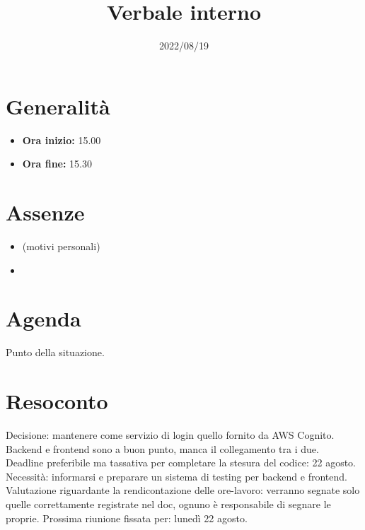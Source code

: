 \documentclass{classes/base}
\title{Verbale interno}
\date{2022/08/19}
\author{\marcob}
\renewcommand{\maketitle}{
    
}
\begin{document}
    \maketitle

    \section*{Generalità}
    \begin{itemize}
        \item \textbf{Ora inizio:} 15.00
        \item \textbf{Ora fine:} 15.30
    \end{itemize}

    \section*{Assenze}
    \begin{itemize}
        \item \giulio (motivi personali)
        \item \ruth
    \end{itemize}

    \section*{Agenda}
    Punto della situazione.

    \section*{Resoconto}
    Decisione: mantenere come servizio di login quello fornito da AWS Cognito.\\
    Backend e frontend sono a buon punto, manca il collegamento tra i due.\\
    Deadline preferibile ma tassativa per completare la stesura del codice: 22 agosto.\\
    Necessità: informarsi e preparare un sistema di testing per backend e frontend.\\
    Valutazione riguardante la rendicontazione delle ore-lavoro: verranno segnate solo quelle 
    correttamente registrate nel doc, ognuno è responsabile di segnare le proprie.\aCapo{}
    Prossima riunione fissata per: lunedì 22 agosto.
\end{document}
